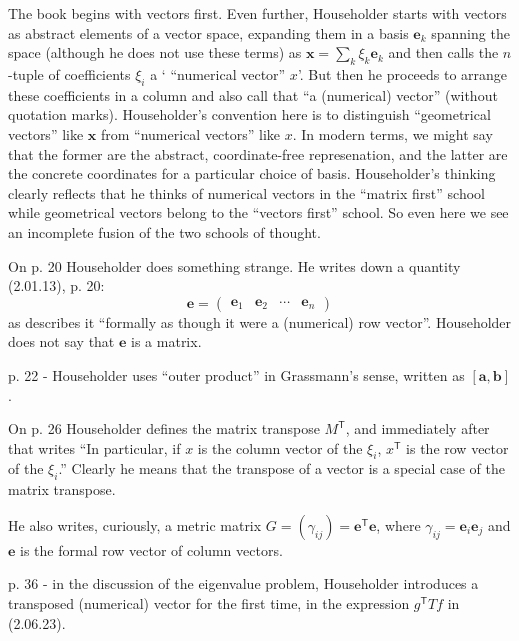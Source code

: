 The book begins with vectors first. Even further, Householder starts with vectors
as abstract elements of a vector space, expanding them in a basis $\mathbf e_k$
spanning the space (although he does not use these terms) as $\mathbf x = \sum_k \xi_k \mathbf e_k$
and then calls the $n$-tuple of coefficients $\xi_i$ a ` ``numerical vector''
$x$'. But then he proceeds to arrange these coefficients in a column and also
call that ``a (numerical) vector'' (without quotation marks).
Householder's convention here is to distinguish  ``geometrical vectors''
like $\mathbf x$ from ``numerical vectors'' like $x$. In modern terms, we might
say that the former are the abstract, coordinate-free represenation, and the
latter are the concrete coordinates for a particular choice of basis.
Householder's thinking clearly reflects that he thinks of numerical vectors in the
``matrix first'' school while geometrical vectors belong to the ``vectors first''
school. So even here we see an incomplete fusion of the two schools of thought.

On p. 20 Householder does something strange. He writes down a quantity (2.01.13), p. 20:
\[
\mathbf e = \begin{pmatrix}\mathbf e_1 & \mathbf e_2 & \cdots & \mathbf e_n\end{pmatrix}
\]
as describes it ``formally as though it were a (numerical) row vector''.
Householder does not say that $\mathbf e$ is a matrix.

p. 22 - Householder uses ``outer product'' in Grassmann's sense, written as $[\mathbf a, \mathbf b]$.

On p. 26 Householder defines the matrix transpose $M^{\mathsf T}$, and immediately
after that writes ``In particular, if $x$ is the column vector of the $\xi_i$,
$x^{\mathsf T}$ is the row vector of the $\xi_i$.'' Clearly he means that the
transpose of a vector is a special case of the matrix transpose.

He also writes, curiously, a metric matrix $G = (\gamma_{ij}) = \mathbf e^{\mathsf T} \mathbf e$,
where $\gamma_{ij} = \mathbf e_i \mathbf e_j$ and $\mathbf e$ is the formal row vector of column vectors.

p. 36 - in the discussion of the eigenvalue problem, Householder introduces a
transposed (numerical) vector for the first time, in the expression $g^{\mathsf T}Tf$
 in (2.06.23).




